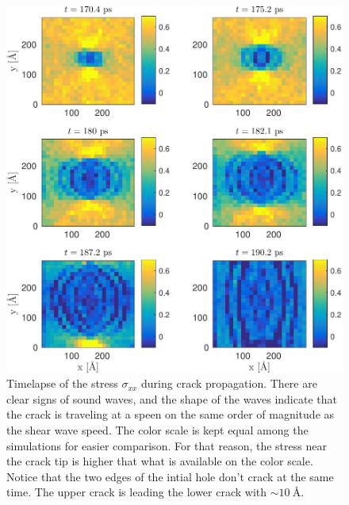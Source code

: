 \begin{figure}
\includegraphics[width=\textwidth]{../figures/thesis/stressfield_timelapse.pdf}
\caption{Timelapse of the stress $\sigma_{xx}$ during crack propagation. There are clear signs of sound waves, and the shape of the waves indicate that the crack is traveling at a speen on the same order of magnitude as the shear wave speed. The color scale is kept equal among the simulations for easier comparison. For that reason, the stress near the crack tip is higher that what is available on the color scale. Notice that the two edges of the intial hole don't crack at the same time. The upper crack is leading the lower crack 
with $\sim \SI{10}{\angstrom}$. }
\label{fig:stressfield_timelapse}
\end{figure}




